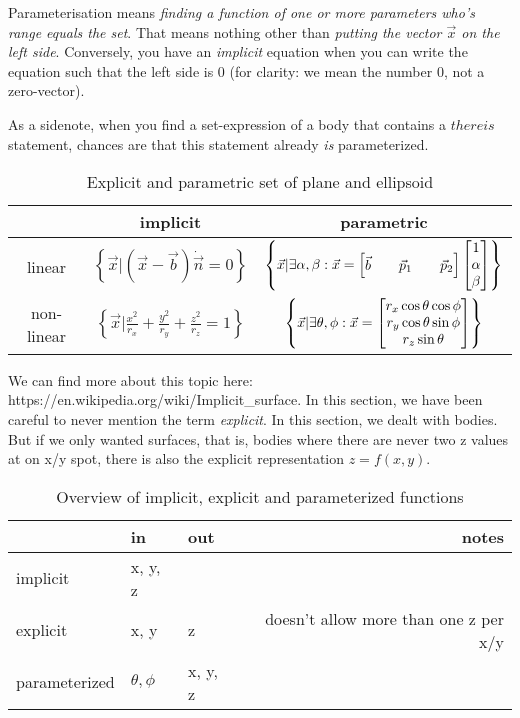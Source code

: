 Parameterisation means \emph{finding a function of one or more parameters who's range equals the set}. That means nothing other than \emph{putting the vector $\vec{x}$ on the left side}. Conversely, you have an \emph{implicit} equation when you can write the equation such that the left side is $0$ (for clarity: we mean the number $0$, not a zero-vector).


As a sidenote, when you find a set-expression of a body that contains a $thereis$ statement, chances are that this statement already \emph{is} parameterized.


\begin{table}[H]
\centering
\caption{Explicit and parametric set of plane and ellipsoid}
\begin{tabular}{c|cc}
           & implicit                                                 & parametric \\
\hline 
linear     & $\left \{\vec{x} | ( \vec{x} - \vec{b} ) \dot \vec{n} = 0 \right \}$  & $\left \{\vec{x} | \exists \alpha, \beta: \vec{x} = \begin{bmatrix} \vec{b} && \vec{p}_1 && \vec{p}_2 \end{bmatrix} \begin{bmatrix} 1 \\ \alpha \\ \beta \end{bmatrix}  \right \}$ \\
non-linear & $\left \{\vec{x} | \frac{x^2}{r_x} + \frac{y^2}{r_y} + \frac{z^2}{r_z} = 1 \right \}$ &  $\left \{\vec{x} | \exists \theta, \phi: \vec{x} = \begin{bmatrix} r_x \cos{\theta} \cos{\phi} \\ r_y \cos{\theta} \sin{\phi} \\ r_z \sin{\theta} \end{bmatrix} \right \}$       
\end{tabular}
\end{table}

We can find more about this topic here: https://en.wikipedia.org/wiki/Implicit\_surface. In this section, we have been careful to never mention the term \emph{explicit}. In this section, we dealt with bodies. But if we only wanted surfaces, that is, bodies where there are never two z values at on x/y spot, there is also the explicit representation $z=f(x,y)$.

\begin{table}[H]
\centering
\caption{Overview of implicit, explicit and parameterized functions}
\begin{tabular}{l|ll|r}
              & in         & out     & notes                                 \\
              \hline
implicit      & x, y, z    &         &                                       \\
explicit      & x, y       & z       & doesn't allow more than one z per x/y \\
parameterized & $\theta, \phi$ & x, y, z &                                      
\end{tabular}
\end{table}

